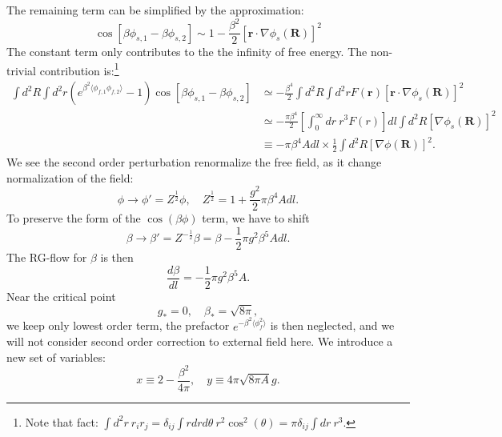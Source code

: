 \documentclass[aps,prb,superscriptaddress,nofootinbib]{revtex4}
\begin{document}
The remaining term can be simplified by the approximation:
\begin{equation}
	\cos\left[\beta\phi_{s,1} -\beta\phi_{s,2}\right]
	\sim 1-\frac{\beta^2}{2} [\bm r \cdot \nabla\phi_s(\bm R)]^2
\end{equation}
The constant term only contributes to the the infinity of free energy.
The non-trivial contribution is:\footnote{Note that fact: $\int d^2r\ r_i r_j = \delta_{ij} \int r dr d\theta\ r^2 \cos^2(\theta) = \pi \delta_{ij} \int dr\ r^3$.}
\begin{equation}
\begin{aligned}
	\int d^2 R \int d^2 r \left(e^{\beta^2 \langle\phi_{f,1}\phi_{f,2}\rangle}-1 \right)\cos\left[\beta\phi_{s,1} -\beta\phi_{s,2}\right] 
	&\simeq -\frac{\beta^4}{2} \int d^2 R \int d^2r F(\bm r) [\bm r \cdot \nabla\phi_s(\bm R)]^2 \\
	&\simeq -\frac{\pi \beta^4}{2} \left[\int_0^\infty dr\ r^3 F(r)\right]dl \int d^2 R [\nabla\phi_s(\bm R)]^2 \\
	&\equiv -\pi \beta^4 A dl \times \frac{1}{2}\int d^2 R [\nabla\phi(\bm R)]^2.
\end{aligned}
\end{equation}
We see the second order perturbation renormalize the free field, as it change normalization of the field:
\begin{equation}
	\phi \rightarrow \phi' = Z^{\frac{1}{2}} \phi, \quad 
	Z^{\frac{1}{2}} = 1 +\frac{g^2}{2} \pi \beta^4 A dl.
\end{equation}
To preserve the form of the $\cos(\beta\phi)$ term, we have to shift
\begin{equation}
	\beta \rightarrow \beta' = Z^{-\frac{1}{2}}\beta = \beta-\frac{1}{2}\pi g^2\beta^5 A dl.
\end{equation}
The RG-flow for $\beta$ is then
\begin{equation}
	\frac{d\beta}{dl} = -\frac{1}{2}\pi g^2\beta^5 A.
\end{equation}
Near the critical point 
\begin{equation}
	g_* = 0, \quad \beta_* = \sqrt{8\pi},
\end{equation}
we keep only lowest order term, the prefactor $e^{-\beta^2\langle\phi_f^2\rangle}$ is then neglected, and we will not consider second order correction to external field here.
We introduce a new set of variables:
\begin{equation}
	x \equiv 2 - \frac{\beta^2}{4\pi}, \quad
	y \equiv 4\pi \sqrt{8\pi A} g.
\end{equation}
\end{document}
